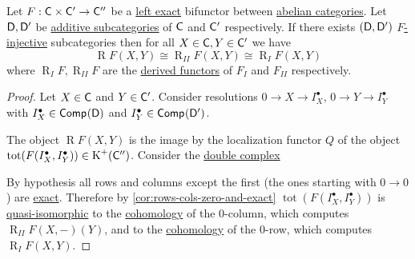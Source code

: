 \documentclass[../../main]{subfiles}
\begin{document}
\begin{theorem}
  Let \(F: \mathsf{C} \times \mathsf{C'} \to \mathsf{C''}\) be a \hyperref[def:exact-functor]{left exact} bifunctor between \hyperref[def:abelian-category]{abelian categories}.
  Let \(\mathsf{D}, \mathsf{D'}\) be \hyperref[def:subcategory]{additive subcategories} of \(\mathsf{C}\) and \(\mathsf{C'}\) respectively.
  If there exists \((\mathsf{D}, \mathsf{D'})\) \hyperref[def:F-injective-bifunctor]{\(F\)-injective} subcategories then for all \(X \in \mathsf{C}, Y \in \mathsf{C'}\) we have
  \begin{equation*}
    \operatorname{R}F(X, Y) \cong \operatorname{R}_{II}F(X, Y) \cong \operatorname{R}_{I}F(X, Y)
  \end{equation*}
  where \(\operatorname{R}_{I}F, \operatorname{R}_{II}F\) are the \hyperref[def:right-derived-functor]{derived functors} of \(F_{I}\) and \(F_{II}\) respectively.
\end{theorem}
\begin{proof}
  Let \(X \in \mathsf{C}\) and \(Y \in \mathsf{C'}\).
  Consider resolutions \(0 \to X \to I_{X}^{\bullet}\), \(0 \to Y \to I_{Y}^{\bullet}\) with \(I_{X}^{\bullet} \in \mathsf{Comp}^{}(\mathsf{D})\) and \(I_{Y}^{\bullet} \in \mathsf{Comp}^{}(\mathsf{D'})\).

  The object \(\operatorname{R}F(X, Y)\) is the image by the localization functor \(Q\) of the object \(\operatorname{tot}(F(I_{X}^{\bullet}, I_{Y}^{\bullet})) \in \operatorname{K}^{+}(\mathsf{C''})\).
  Consider the \hyperref[def:double-complex]{double complex}
  \begin{center}
  \end{center}
  By hypothesis all rows and columns except the first (the ones starting with \(0 \to 0\)) are \hyperref[def:exact-sequence]{exact}.
  Therefore by \autoref{cor:rows-cols-zero-and-exact} \(\operatorname{tot}(F(I_{X}^{\bullet}, I_{Y}^{\bullet}))\) is \hyperref[def:quasi-isomorphism]{quasi-isomorphic} to the \hyperref[def:cohomology]{cohomology} of the \(0\)-column, which computes \(\operatorname{R}_{II}F(X, -)(Y)\), and to the \hyperref[def:cohomology]{cohomology} of the \(0\)-row, which computes \(\operatorname{R}_{I}F(X, Y)\).
\end{proof}
\end{document}
